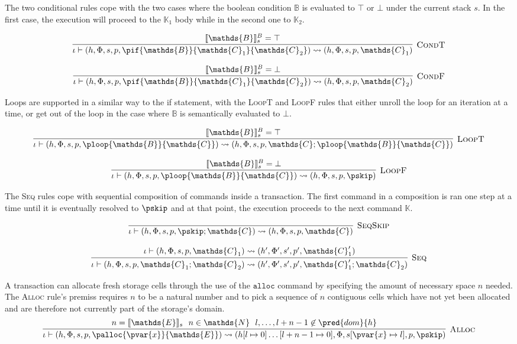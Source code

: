 The two conditional rules cope with the two cases where the boolean condition $\mathds{B}$ is evaluated to $\top$ or $\bot$ under the current stack $s$. In the first case, the execution will proceed to the $\mathds{K}_1$ body while in the second one to $\mathds{K}_2$.

\[
\infer[\textsc{CondT}]
{
	\iota \vdash (h, \Phi, s, p, \pif{\mathds{B}}{\mathds{C}_1}{\mathds{C}_2})
	\rightsquigarrow
	(h, \Phi, s, p, \mathds{C}_1)
}
{
	\llbracket \mathds{B} \rrbracket_s^B = \top
}
\]

\[
\infer[\textsc{CondF}]
{
	\iota \vdash (h, \Phi, s, p, \pif{\mathds{B}}{\mathds{C}_1}{\mathds{C}_2})
	\rightsquigarrow
	(h, \Phi, s, p, \mathds{C}_2)
}
{
	\llbracket \mathds{B} \rrbracket_s^B = \bot
}
\]

Loops are supported in a similar way to the if statement, with the \textsc{LoopT} and \textsc{LoopF} rules that either unroll the loop for an iteration at a time, or get out of the loop in the case where $\mathds{B}$ is semantically evaluated to $\bot$.

\[
\infer[\textsc{LoopT}]
{
	\iota \vdash (h, \Phi, s, p, \ploop{\mathds{B}}{\mathds{C}})
	\rightsquigarrow
	(h, \Phi, s, p, \mathds{C}; \ploop{\mathds{B}}{\mathds{C}})
}
{
	\llbracket \mathds{B} \rrbracket_s^B = \top
}
\]

\[
\infer[\textsc{LoopF}]
{
	\iota \vdash (h, \Phi, s, p, \ploop{\mathds{B}}{\mathds{C}})
	\rightsquigarrow
	(h, \Phi, s, p, \pskip)
}
{
	\llbracket \mathds{B} \rrbracket_s^B = \bot
}
\]

The \textsc{Seq} rules cope with sequential composition of commands inside a transaction. The first command in a composition is ran one step at a time until it is eventually resolved to $\pskip$ and at that point, the execution proceeds to the next command $\mathds{K}$.

\[
\infer[\textsc{SeqSkip}]
{
	\iota \vdash (h, \Phi, s, p, \pskip ; \mathds{C})
	\rightsquigarrow
	(h, \Phi, s, p, \mathds{C})
}
{}
\]

\[
\infer[\textsc{Seq}]
{
	\iota \vdash (h, \Phi, s, p, \mathds{C}_1 ; \mathds{C}_2)
	\rightsquigarrow
	(h', \Phi', s', p', \mathds{C}_1' ; \mathds{C}_2)
}
{
	\iota \vdash (h, \Phi, s, p, \mathds{C}_1)
	\rightsquigarrow
	(h', \Phi', s', p', \mathds{C}_1')
}
\]

A transaction can allocate fresh storage cells through the use of the $\mathtt{alloc}$ command by specifying the amount of necessary space $n$ needed. The \textsc{Alloc} rule's premiss requires $n$ to be a natural number and to pick a sequence of $n$ contiguous cells which have not yet been allocated and are therefore not currently part of the storage's domain.
\[
\infer[\textsc{Alloc}]
{
	\iota \vdash (h, \Phi, s, p, \palloc{\pvar{x}}{\mathds{E}})
	\rightsquigarrow
	(h[l \mapsto 0] \ldots [l + n - 1 \mapsto 0], \Phi, s[\pvar{x} \mapsto l], p, \pskip)
}
{
	n = \llbracket \mathds{E} \rrbracket_s\ \
	n \in \mathds{N}\ \
	l, \ldots, l + n - 1 \not\in \pred{dom}{h}
}
\]


